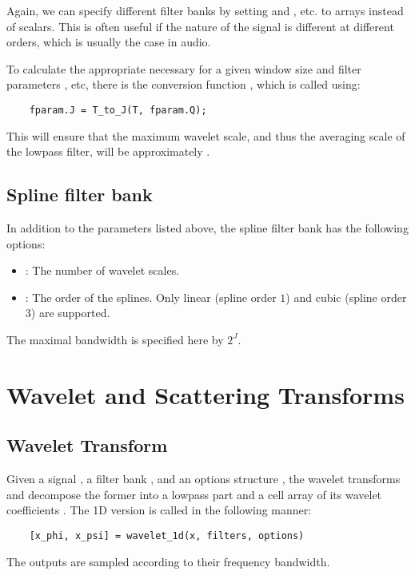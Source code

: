 \documentclass[twocolumn]{article}
\begin{document}
Again, we can specify different filter banks by setting  and , etc. to arrays instead of scalars. This is often useful if the nature of the signal is different at different orders, which is usually the case in audio.

To calculate the appropriate  necessary for a given window size  and filter parameters , etc, there is the conversion function , which is called using:
\begin{lstlisting}
	fparam.J = T_to_J(T, fparam.Q);
\end{lstlisting}
This will ensure that the maximum wavelet scale, and thus the averaging scale of the lowpass filter, will be approximately .

\subsection{Spline filter bank}

In addition to the parameters listed above, the spline filter bank has the following options:
\begin{itemize}
	\item {}: The number of wavelet scales.
	\item {}: The order of the splines. Only linear (spline order $1$) and cubic (spline order $3$) are supported.
\end{itemize}
The maximal bandwidth is specified here by $2^J$.

\section{Wavelet and Scattering Transforms}

\subsection{Wavelet Transform}

Given a signal , a filter bank , and an options structure , the wavelet transforms  and  decompose the former into a lowpass part  and a cell array of its wavelet coefficients . The 1D version is called in the following manner:
\begin{lstlisting}
	[x_phi, x_psi] = wavelet_1d(x, filters, options)
\end{lstlisting}
The outputs are sampled according to their frequency bandwidth.
\end{document}
